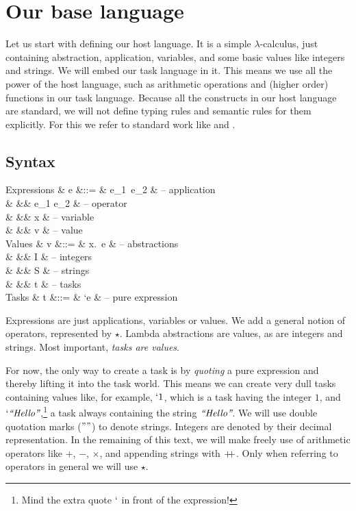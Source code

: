 
\section{Our base language}

Let us start with defining our host language.
It is a simple $\lambda$-calculus,
just containing abstraction, application, variables,
and some basic values like integers and strings.
We will embed our task language in it.
This means we use all the power of the host language,
such as arithmetic operations and (higher order) functions in our task language.
Because all the constructs in our host language are standard,
we will not define typing rules and semantic rules for them explicitly.
For this we refer to standard work like \textcite{pierce2002types} and \textcite{harper2016practical}.


\subsection{Syntax}

\begin{grammar}
  Expressions
    & e &::= & e_1\ e_2       & – application \\
    &   &\mid& e_1 \star e_2  & – operator \\
    &   &\mid& x              & – variable \\
    &   &\mid& v              & – value \\
  Values
    & v &::= & \lambda x.\ e  & – abstractions \\
    &   &\mid& I              & – integers \\
    &   &\mid& S              & – strings \\
    &   &\mid& t              & – tasks \\
  Tasks
    & t &::= & `e             & – pure expression \\
\end{grammar}
Expressions are just applications, variables or values.
We add a general notion of operators, represented by $\star$.
Lambda abstractions are values, as are integers and strings.
Most important, \emph{tasks are values}.

For now, the only way to create a task is by \emph{quoting} a pure expression
and thereby lifting it into the task world.
This means we can create very dull tasks containing values like, for example, $`1$,
which is a task having the integer $1$,
and $`\textit{``Hello''}$,\footnote{
  Mind the extra quote $`$ in front of the expression!
}
a task always containing the string $\textit{``Hello''}$.
We will use double quotation marks ($""$) to denote strings.
Integers are denoted by their decimal representation.
In the remaining of this text,
we will make freely use of arithmetic operators like $+$, $-$, $\times$,
and appending strings with $+\!\!+$.
Only when referring to operators in general we will use $\star$.


